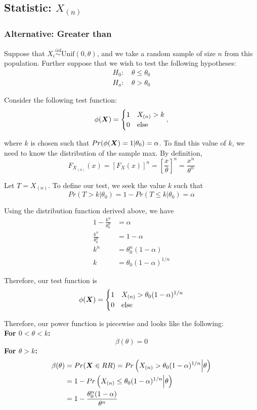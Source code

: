 \documentclass[]{article}
\newcommand{\bfX}{\mbox{\boldmath $X$}}
\begin{document}
\subsection{Statistic: $X_{(n)}$}

\subsubsection{Alternative: Greater than}

Suppose that $X_i \stackrel{iid}{\sim} \text{Unif}(0, \theta)$, and we take a random sample of size $n$ from this population. Further suppose that we wish to test the following hypotheses:
\[
\begin{split}
\text{$H_0$: }& \theta \leq \theta_0 \\
\text{$H_a$: }& \theta > \theta_0
\end{split}
\]

Consider the following test function:
\[
\phi(\bfX) = \begin{cases}
1 & X_{(n)} > k \\
0 & \text{else}
\end{cases},
\]

where $k$ is chosen such that $Pr(\phi(\bfX) = 1|\theta_0) = \alpha$. To find this value of $k$, we need to know the distribution of the sample max. By definition, 
\[
F_{X_{(n)}}(x) = \left[F_X(x)\right]^n = \left[\frac{x}{\theta}\right]^n = \frac{x^n}{\theta^n}
\]


Let $T = X_{(n)}$. To define our test, we seek the value $k$ such that 
\[
Pr(T > k | \theta_0) = 1 - Pr(T \leq k | \theta_0) = \alpha
\]

Using the distribution function derived above, we have
\[
\begin{split}
1 - \frac{k^n}{\theta_0^n} &= \alpha \\
\frac{k^n}{\theta_0^n} &= 1 - \alpha \\
k^n &= \theta_0^n(1-\alpha) \\
k &= \theta_0(1-\alpha)^{1/n}
\end{split}
\]

Therefore, our test function is
\[
\phi(\bfX) = \begin{cases}
1 & X_{(n)} > \theta_0(1-\alpha)^{1/n} \\
0 & \text{else}
\end{cases}
\]

Therefore, our power function is piecewise and looks like the following:\\
\textbf{For $0 < \theta < k$:}
\[
\beta(\theta) = 0
\]
\textbf{For $\theta > k$:}
\[
\begin{split}
\beta(\theta) &= Pr(\bfX \in RR) = Pr\left(X_{(n)} > \theta_0(1-\alpha)^{1/n} \Big| \theta\right) \\
&= 1 - Pr\left(X_{(n)}\leq \theta_0(1-\alpha)^{1/n} \Big| \theta\right) \\
&= 1 - \frac{\theta_0^n(1-\alpha)}{\theta^n}
\end{split}
\]
\end{document}
